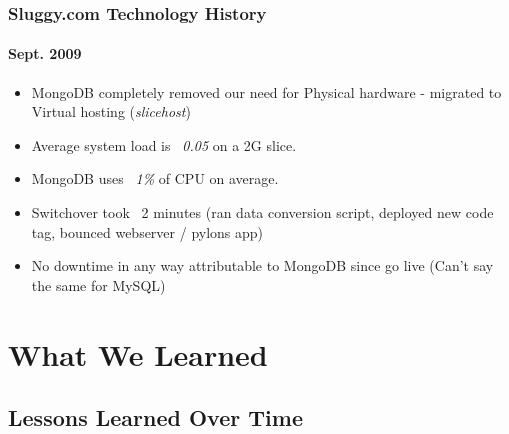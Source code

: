\documentclass{beamer}
\begin{document}
\begin{frame}
\frametitle{Sluggy.com Technology History}
\framesubtitle{Sept. 2009}
	\begin{itemize}
		\item MongoDB completely removed our need for Physical hardware - migrated to Virtual hosting ({\em slicehost})
		\item Average system load is {\em ~0.05} on a 2G slice.
		\item MongoDB uses {\em ~1\%} of CPU on average.
		\item Switchover took ~2 minutes (ran data conversion script, deployed new code tag, bounced webserver / pylons app)
		\item No downtime in any way attributable to MongoDB since go live (Can't say the same for MySQL)
	\end{itemize}
\end{frame}

\section{What We Learned}
\subsection[Lessons Learned]{Lessons Learned Over Time}
\end{document}
